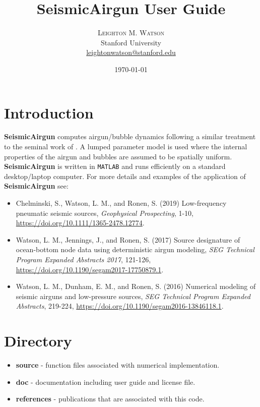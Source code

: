 \documentclass[10pt]{article}
\title{SeismicAirgun User Guide} %
\author{%
\textsc{Leighton M. Watson} \\%
\normalsize Stanford University \\ %
\normalsize \href{mailto:leightonwatson@stanford.edu}{leightonwatson@stanford.edu} %
}
\date{\today} %
\begin{document}
\maketitle


\section{Introduction}
{\bf SeismicAirgun} computes airgun/bubble dynamics following a similar treatment to the seminal work of \citet{Ziolkowski1970}. A lumped parameter model is used where the internal properties of the airgun and bubbles are assumed to be spatially uniform. {\bf SeismicAirgun} is written in \texttt{MATLAB} and runs efficiently on a standard desktop/laptop computer. For more details and examples of the application of {\bf SeismicAirgun} see:
\begin{itemize}
\item Chelminski, S., Watson, L. M., and Ronen, S. (2019) Low-frequency pneumatic seismic sources, \emph{Geophysical Prospecting}, 1-10, \href{https://doi.org/10.1111/1365-2478.12774}{https://doi.org/10.1111/1365-2478.12774}.
\item Watson, L. M., Jennings, J., and Ronen, S. (2017) Source designature of ocean-bottom node data using deterministic airgun modeling, \emph{SEG Technical Program Expanded Abstracts 2017}, 121-126, \href{https://doi.org/10.1190/segam2017-17750879.1}{https://doi.org/10.1190/segam2017-17750879.1}.
\item Watson, L. M., Dunham, E. M., and Ronen, S. (2016) Numerical modeling of seismic airguns and low-pressure sources, \emph{SEG Technical Program Expanded Abstracts}, 219-224, \href{https://doi.org/10.1190/segam2016-13846118.1}{https://doi.org/10.1190/\-segam2016-13846118.1}.
\end{itemize}

\section{Directory}
\begin{itemize}
\item{\bf source} - function files associated with numerical implementation. 
\item {\bf doc} - documentation including user guide and license file.
\item {\bf references} - publications that are associated with this code.
\end{itemize}
\end{document}
